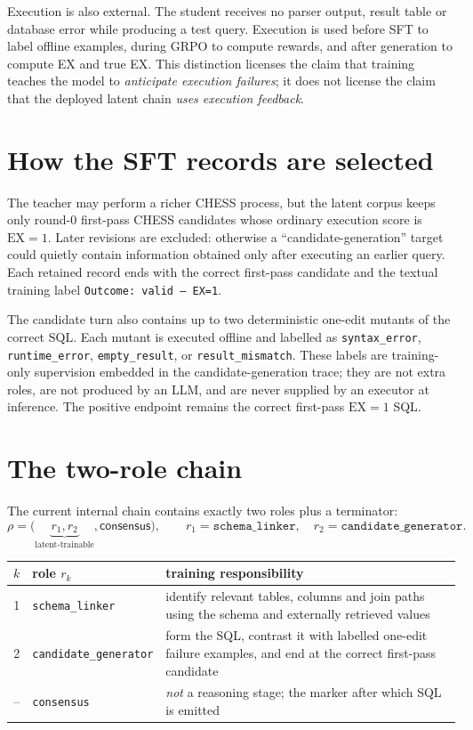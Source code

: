 \documentclass[11pt]{article}
\theoremstyle{definition}
\begin{document}
Execution is also external. The student receives no parser output, result table or database error while producing a test query. Execution is used before SFT to label offline examples, during GRPO to compute rewards, and after generation to compute EX and true EX. This distinction licenses the claim that training teaches the model to \emph{anticipate execution failures}; it does not license the claim that the deployed latent chain \emph{uses execution feedback}.

\section{How the SFT records are selected}

The teacher may perform a richer CHESS process, but the latent corpus keeps only round-$0$ first-pass CHESS candidates whose ordinary execution score is $\mathrm{EX}=1$. Later revisions are excluded: otherwise a ``candidate-generation'' target could quietly contain information obtained only after executing an earlier query. Each retained record ends with the correct first-pass candidate and the textual training label \texttt{Outcome: valid --- EX=1}.

The candidate turn also contains up to two deterministic one-edit mutants of the correct SQL. Each mutant is executed offline and labelled as \texttt{syntax\_error}, \texttt{runtime\_error}, \texttt{empty\_result}, or \texttt{result\_mismatch}. These labels are training-only supervision embedded in the candidate-generation trace; they are not extra roles, are not produced by an LLM, and are never supplied by an executor at inference. The positive endpoint remains the correct first-pass $\mathrm{EX}=1$ SQL.

\section{The two-role chain}

The current internal chain contains exactly two roles plus a terminator:
\[
\rho = \big(\underbrace{r_1,r_2}_{\text{latent-trainable}},\textsf{consensus}\big),\qquad r_1=\texttt{schema\_linker},\quad r_2=\texttt{candidate\_generator}.
\]
\begin{center}
\begin{tabular}{clp{}}
\toprule
$k$ & role $r_k$ & training responsibility \\
\midrule
1 & \texttt{schema\_linker} & identify relevant tables, columns and join paths using the schema and externally retrieved values \\
2 & \texttt{candidate\_generator} & form the SQL, contrast it with labelled one-edit failure examples, and end at the correct first-pass candidate \\
\midrule
-- & \texttt{consensus} & \emph{not} a reasoning stage; the marker after which SQL is emitted \\
\bottomrule
\end{tabular}
\end{center}
\end{document}
